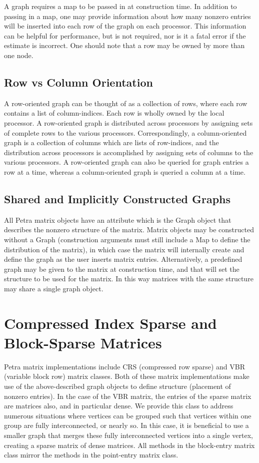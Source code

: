 \documentclass[12pt,relax]{PetraObjectModel}
\begin{document}
A graph requires a map to be passed in at construction time.
In addition to passing in a map, one may provide
information about how many nonzero entries will be inserted into each row 
of the graph on each processor.  This information can be helpful for
performance, but is not required, nor is it a fatal error if the estimate
is incorrect.  One should note that a row may be owned by more than one node.

\subsection{Row vs Column Orientation}
A row-oriented graph can be thought of as a collection of rows, where each row
contains a list of column-indices. Each row is wholly owned by the local
processor. A row-oriented graph is distributed across processors by assigning
sets of complete rows to the various processors. Correspondingly, a
column-oriented graph is a collection of columns which are lists of row-indices,
and the distribution across processors is accomplished by assigning sets of
columns to the various processors.
A row-oriented graph can also be queried for graph entries a row at a time,
whereas a column-oriented graph is queried a column at a time.

\subsection{Shared and Implicitly Constructed Graphs}
All Petra matrix objects have an attribute which is the Graph object that
describes the nonzero structure of the matrix. Matrix objects may be constructed
without a Graph (construction arguments must still include a Map to define the
distribution of the matrix), in which case the matrix will internally create
and define the graph as the user inserts matrix entries. Alternatively, a
predefined graph
may be given to the matrix at construction time, and that will set the
structure to be used for the matrix. In this way matrices with the same
structure may share a single graph object.

\section{Compressed Index Sparse and Block-Sparse Matrices}
Petra matrix implementations include CRS (compressed row sparse) and
VBR (variable block row) matrix classes. Both of these matrix implementations
make use of the above-described graph objects to define structure (placement
of nonzero entries). In the case of the VBR matrix, the entries of the sparse
matrix are matrices also, and in particular dense.  We provide this class
to address numerous situations where vertices can be grouped such that
vertices within one group are fully interconnected, or nearly so.  In this
case, it is beneficial to use a smaller graph that merges these fully
interconnected vertices into a single vertex, creating a sparse matrix of
dense matrices.  All methods in the block-entry matrix class mirror the methods 
in the point-entry matrix class.
\end{document}
